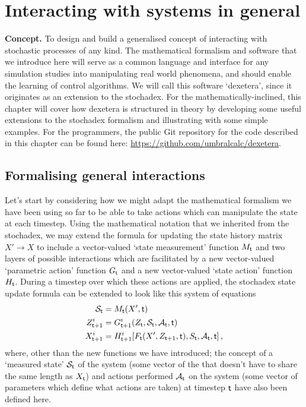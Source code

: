 \chapter{\sffamily Interacting with systems in general}

{\bfseries\sffamily Concept.} To design and build a generalised concept of interacting with stochastic processes of any kind. The mathematical formalism and software that we introduce here will serve as a common language and interface for any simulation studies into manipulating real world phenomena, and should enable the learning of control algorithms. We will call this software `dexetera', since it originates as an extension to the stochadex. For the mathematically-inclined, this chapter will cover how dexetera is structured in theory by developing some useful extensions to the stochadex formalism and illustrating with some simple examples. For the programmers, the public Git repository for the code described in this chapter can be found here: \href{https://github.com/umbralcalc/dexetera}{https://github.com/umbralcalc/dexetera}.

\section{\sffamily Formalising general interactions}

Let's start by considering how we might adapt the mathematical formalism we have been using so far to be able to take actions which can manipulate the state at each timestep. Using the mathematical notation that we inherited from the stochadex, we may extend the formula for updating the state history matrix $X'\rightarrow X$ to include a vector-valued `state measurement' function $M_{\sf t}$ and two layers of possible interactions which are facilitated by a new vector-valued `parametric action' function $G_{{\sf t}}$ and a new vector-valued `state action' function $H_{{\sf t}}$. During a timestep over which these actions are applied, the stochadex state update formula can be extended to look like this system of equations
\begin{align}
{\cal S}_{{\sf t}} &= M_{{\sf t}}(X', {\sf t}) \label{eq:generalised-state-measurement} \\
Z_{{\sf t}+1}^i &= G_{{\sf t}+1}^i(Z_{{\sf t}}, {\cal S}_{{\sf t}}, {\cal A}_{{\sf t}}, {\sf t}) \label{eq:generalised-param-actions} \\
X_{{\sf t}+1}^i &= H^i_{{\sf t}+1}[F_{\sf t}(X', Z_{{\sf t}+1}, {\sf t}), S_{\sf t}, {\cal A}_{\sf t}, {\sf t}] \label{eq:generalised-state-actions} \,,
\end{align}
where, other than the new functions we have introduced; the concept of a `measured state' ${\cal S}_{{\sf t}}$ of the system (some vector of the that doesn't have to share the same length as $X_{\sf t}$) and actions performed ${\cal A}_{{\sf t}}$ on the system (some vector of parameters which define what actions are taken) at timestep ${\sf t}$ have also been defined here.

